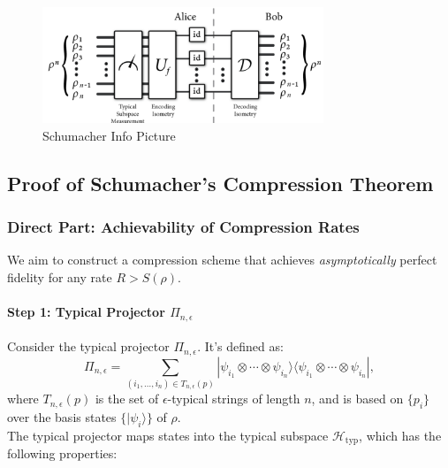 \begin{figure}[H]
    \centering
    \includegraphics[width=0.75\textwidth]{figures/schumacher.png}
    \caption{Schumacher Info Picture \cite{PhysRevA.51.2738}}
\end{figure}

\subsection{Proof of Schumacher's Compression Theorem}

\subsubsection{Direct Part: Achievability of Compression Rates}

We aim to construct a compression scheme that achieves \textit{asymptotically} perfect fidelity for any rate \(R > S(\rho)\).

\paragraph{Step 1: Typical Projector \(\Pi_{n, \epsilon}\)}

Consider the typical projector \(\Pi_{n, \epsilon}\). It's defined as:
\[
\Pi_{n, \epsilon} = \sum_{(i_1, \dots, i_n) \in T_{n, \epsilon}(p)} |\psi_{i_1} \otimes \cdots \otimes \psi_{i_n}\rangle \langle \psi_{i_1} \otimes \cdots \otimes \psi_{i_n}|,
\]
where \(T_{n, \epsilon}(p)\) is the set of \(\epsilon\)-typical strings of length \(n\), and is based on \(\{p_i\}\) over the basis states \(\{|\psi_i\rangle\}\) of \(\rho\). 
\\
The typical projector maps states into the typical subspace \(\mathcal{H}_{\text{typ}}\), which has the following properties:

